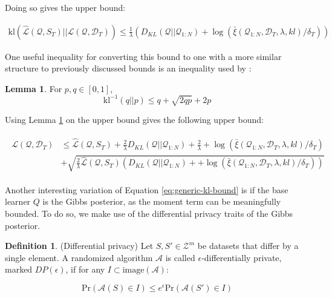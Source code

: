 \documentclass{article}
\theoremstyle{definition}
\newtheorem{defn}{Definition}[section]
\newtheorem{lemma}[theorem]{Lemma}
\begin{document}
Doing so gives the upper bound:

\begin{align} \label{eq:generic-kl-bound}
\mathrm{kl}(\hat{\mathcal{L}}(\mathcal{Q}, S_T)||\mathcal{L}(\mathcal{Q},\mathcal{D}_T)) \leq \frac{1}{\lambda}\left (D_{KL}(\mathcal{Q}||\mathcal{Q}_{1:N})+\log\left (\bar{\xi}(\mathcal{Q}_{1:N}, \mathcal{D}_T,\lambda, kl)/\delta_T\right ) \right )
\end{align}

One useful inequality for converting this bound to one with a more similar structure to previously discussed bounds is an inequality used by \citet{Tolstikhin2013}:

\begin{lemma} \citep{Tolstikhin2013} \label{thm:kl-inverse}
	For $p,q \in [0, 1]$,
	$$\mathrm{kl}^{-1}(q||p)\leq q + \sqrt{2qp}+2p$$
\end{lemma}

Using Lemma \ref{thm:kl-inverse} on the upper bound gives the following upper bound:

\begin{align} \label{eq:tolstikhin-kl-bound}
\begin{split}
\mathcal{L}(\mathcal{Q},\mathcal{D}_T) &\leq \hat{\mathcal{L}}(\mathcal{Q}, S_T) + \frac{2}{\lambda}D_{KL}(\mathcal{Q}||\mathcal{Q}_{1:N})+\frac{2}{\lambda}+\log\left (\bar{\xi}(\mathcal{Q}_{1:N}, \mathcal{D}_T,\lambda, kl)/\delta_T\right )\\
&+\sqrt{\frac{2}{\lambda}\hat{\mathcal{L}}(\mathcal{Q}, S_T)\left (D_{KL}(\mathcal{Q}||\mathcal{Q}_{1:N})++\log\left (\bar{\xi}(\mathcal{Q}_{1:N}, \mathcal{D}_T,\lambda, kl)/\delta_T\right )\right )}
\end{split}
\end{align}

Another interesting variation of Equation \ref{eq:generic-kl-bound} is if the base learner $Q$ is the Gibbs posterior, as the moment term can be meaningfully bounded. To do so, we make use of the differential privacy traits of the Gibbs posterior.

\begin{defn} (Differential privacy)
	Let $S,S'\in \mathcal{Z}^m$ be datasets that differ by a single element.
	A randomized algorithm $\mathcal{A}$ is called  $\epsilon$-differentially private, marked $DP(\epsilon)$, if for any $I\subset \mathrm{image}(\mathcal{A})$:
	
	$$\mathrm{Pr}(\mathcal{A}(S)\in I)\leq e^\epsilon \mathrm{Pr}(\mathcal{A}(S')\in I)$$
\end{defn}
\end{document}
